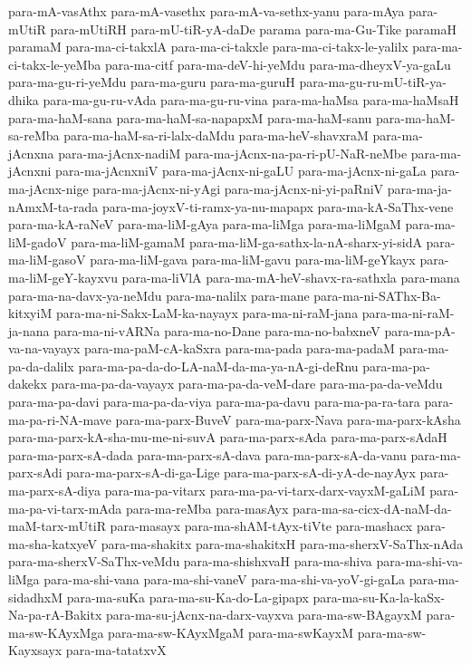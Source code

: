 {para-mA-vasAthx
para-mA-vasethx
para-mA-va-sethx-yanu
para-mAya
para-mUtiR
para-mUtiRH
para-mU-tiR-yA-daDe
parama
para-ma-Gu-Tike
paramaH
paramaM
para-ma-ci-takxlA
para-ma-ci-takxle
para-ma-ci-takx-le-yalilx
para-ma-ci-takx-le-yeMba
para-ma-citf
para-ma-deV-hi-yeMdu
para-ma-dheyxV-ya-gaLu
para-ma-gu-ri-yeMdu
para-ma-guru
para-ma-guruH
para-ma-gu-ru-mU-tiR-ya-dhika
para-ma-gu-ru-vAda
para-ma-gu-ru-vina
para-ma-haMsa
para-ma-haMsaH
para-ma-haM-sana
para-ma-haM-sa-napapxM
para-ma-haM-sanu
para-ma-haM-sa-reMba
para-ma-haM-sa-ri-lalx-daMdu
para-ma-heV-shavxraM
para-ma-jAcnxna
para-ma-jAcnx-nadiM
para-ma-jAcnx-na-pa-ri-pU-NaR-neMbe
para-ma-jAcnxni
para-ma-jAcnxniV
para-ma-jAcnx-ni-gaLU
para-ma-jAcnx-ni-gaLa
para-ma-jAcnx-nige
para-ma-jAcnx-ni-yAgi
para-ma-jAcnx-ni-yi-paRniV
para-ma-ja-nAmxM-ta-rada
para-ma-joyxV-ti-ramx-ya-nu-mapapx
para-ma-kA-SaThx-vene
para-ma-kA-raNeV
para-ma-liM-gAya
para-ma-liMga
para-ma-liMgaM
para-ma-liM-gadoV
para-ma-liM-gamaM
para-ma-liM-ga-sathx-la-nA-sharx-yi-sidA
para-ma-liM-gasoV
para-ma-liM-gava
para-ma-liM-gavu
para-ma-liM-geYkayx
para-ma-liM-geY-kayxvu
para-ma-liVlA
para-ma-mA-heV-shavx-ra-sathxla
para-mana
para-ma-na-davx-ya-neMdu
para-ma-nalilx
para-mane
para-ma-ni-SAThx-Ba-kitxyiM
para-ma-ni-Sakx-LaM-ka-nayayx
para-ma-ni-raM-jana
para-ma-ni-raM-ja-nana
para-ma-ni-vARNa
para-ma-no-Dane
para-ma-no-babxneV
para-ma-pA-va-na-vayayx
para-ma-paM-cA-kaSxra
para-ma-pada
para-ma-padaM
para-ma-pa-da-dalilx
para-ma-pa-da-do-LA-naM-da-ma-ya-nA-gi-deRnu
para-ma-pa-dakekx
para-ma-pa-da-vayayx
para-ma-pa-da-veM-dare
para-ma-pa-da-veMdu
para-ma-pa-davi
para-ma-pa-da-viya
para-ma-pa-davu
para-ma-pa-ra-tara
para-ma-pa-ri-NA-mave
para-ma-parx-BuveV
para-ma-parx-Nava
para-ma-parx-kAsha
para-ma-parx-kA-sha-mu-me-ni-suvA
para-ma-parx-sAda
para-ma-parx-sAdaH
para-ma-parx-sA-dada
para-ma-parx-sA-dava
para-ma-parx-sA-da-vanu
para-ma-parx-sAdi
para-ma-parx-sA-di-ga-Lige
para-ma-parx-sA-di-yA-de-nayAyx
para-ma-parx-sA-diya
para-ma-pa-vitarx
para-ma-pa-vi-tarx-darx-vayxM-gaLiM
para-ma-pa-vi-tarx-mAda
para-ma-reMba
para-masAyx
para-ma-sa-cicx-dA-naM-da-maM-tarx-mUtiR
para-masayx
para-ma-shAM-tAyx-tiVte
para-mashacx
para-ma-sha-katxyeV
para-ma-shakitx
para-ma-shakitxH
para-ma-sherxV-SaThx-nAda
para-ma-sherxV-SaThx-veMdu
para-ma-shishxvaH
para-ma-shiva
para-ma-shi-va-liMga
para-ma-shi-vana
para-ma-shi-vaneV
para-ma-shi-va-yoV-gi-gaLa
para-ma-sidadhxM
para-ma-suKa
para-ma-su-Ka-do-La-gipapx
para-ma-su-Ka-la-kaSx-Na-pa-rA-Bakitx
para-ma-su-jAcnx-na-darx-vayxva
para-ma-sw-BAgayxM
para-ma-sw-KAyxMga
para-ma-sw-KAyxMgaM
para-ma-swKayxM
para-ma-sw-Kayxsayx
para-ma-tatatxvX
}
